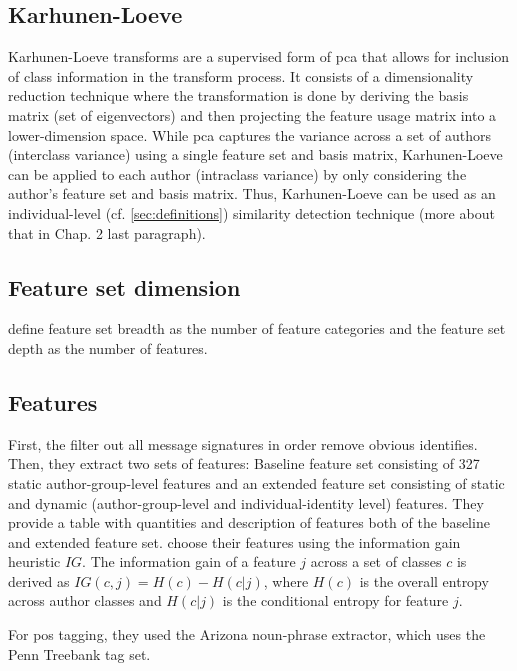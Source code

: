 \subsection{Karhunen-Loeve}
\label{sec:karhunen-loeve}

Karhunen-Loeve transforms are a supervised form of \ac{pca} that allows for inclusion of class information in the transform process.
It consists of a dimensionality reduction technique where the transformation is done by deriving the basis matrix (set of eigenvectors) and 
then projecting the feature usage matrix into a lower-dimension space.
While \ac{pca} captures the variance across a set of authors (interclass variance) using a single feature set and basis matrix, 
Karhunen-Loeve can be applied to each author (intraclass variance) by only considering the author's feature set and basis matrix.
Thus, Karhunen-Loeve can be used as an individual-level (cf. \autoref{sec:definitions}) similarity detection technique 
(more about that in \cite{abbasi_writeprints_2008} Chap. 2 last paragraph).


\subsection{Feature set dimension}
\label{sec:feature-set-dimension}

\citet{abbasi_writeprints_2008} define feature set breadth as the number of feature categories and 
the feature set depth as the number of features.

\subsection{Features}

First, the \citet{abbasi_writeprints_2008} filter out all message signatures in order remove obvious identifies.
Then, they extract two sets of features: Baseline feature set consisting of 327 static author-group-level features and an 
extended feature set consisting of static and dynamic (author-group-level and individual-identity level) features.
They provide a table with quantities and description of features both of the baseline and extended feature set.
\citet{abbasi_writeprints_2008} choose their features using the information gain heuristic $IG$.
The information gain of a feature $j$ across a set of classes $c$ is derived as $IG(c,j)=H(c)-H(c|j)$, 
where $H(c)$ is the overall entropy across author classes and $H(c|j)$ is the conditional entropy for feature $j$.

For \ac{pos} tagging, they used the Arizona noun-phrase extractor, which uses the Penn Treebank tag set.